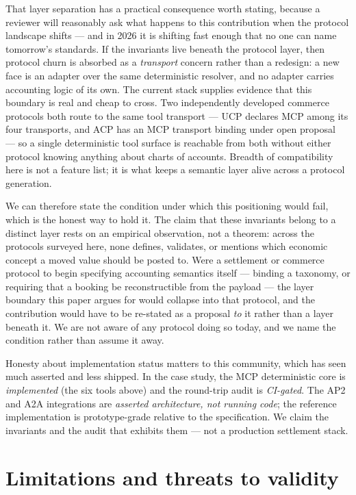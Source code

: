 \documentclass[11pt]{clapps}  %
\begin{document}
That layer separation has a practical consequence worth stating, because a
reviewer will reasonably ask what happens to this contribution when the protocol
landscape shifts --- and in 2026 it is shifting fast enough that no one can name
tomorrow's standards. If the invariants live beneath the protocol layer, then
protocol churn is absorbed as a \emph{transport} concern rather than a redesign:
a new face is an adapter over the same deterministic resolver, and no adapter
carries accounting logic of its own. The current stack supplies evidence that
this boundary is real and cheap to cross. Two independently developed commerce
protocols both route to the same tool transport --- UCP declares MCP among its
four transports, and ACP has an MCP transport binding under open
proposal~\cite{ucp_spec,acp_spec} --- so a single deterministic tool surface is
reachable from both without either protocol knowing anything about charts of
accounts. Breadth of compatibility here is not a feature list; it is what keeps a
semantic layer alive across a protocol generation.

We can therefore state the condition under which this positioning would fail,
which is the honest way to hold it. The claim that these invariants belong to a
distinct layer rests on an empirical observation, not a theorem: across the
protocols surveyed here, none defines, validates, or mentions which economic
concept a moved value should be posted to. Were a settlement or commerce protocol
to begin specifying accounting semantics itself --- binding a taxonomy, or
requiring that a booking be reconstructible from the payload --- the layer
boundary this paper argues for would collapse into that protocol, and the
contribution would have to be re-stated as a proposal \emph{to} it rather than a
layer beneath it. We are not aware of any protocol doing so today, and we name
the condition rather than assume it away.

Honesty about implementation status matters to this community, which has seen
much asserted and less shipped. In the case study, the MCP deterministic core is
\emph{implemented} (the six tools above) and the round-trip audit is
\emph{CI-gated}. The AP2 and A2A integrations are \emph{asserted architecture,
not running code}; the reference implementation is prototype-grade relative to
the specification. We claim the invariants and the audit that exhibits them ---
not a production settlement stack.

\section{Limitations and threats to validity}
\end{document}
